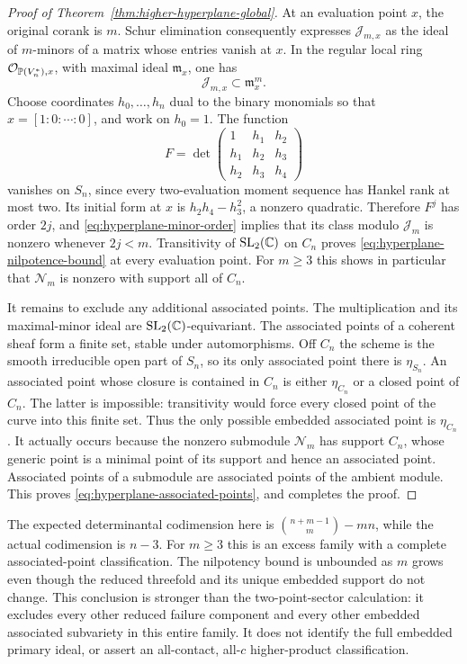 \begin{proof}[Proof of Theorem~\ref{thm:higher-hyperplane-global}]
At an evaluation point $x$, the original corank is $m$. Schur
elimination consequently expresses $\mathcal J_{m,x}$ as the ideal
of $m$-minors of a matrix whose entries vanish at $x$. In the regular
local ring $\mathcal O_{\mathbb P(V_n^*),x}$, with maximal ideal
$\mathfrak m_x$, one has
\begin{equation}\label{eq:hyperplane-minor-order}
 \mathcal J_{m,x}\subset\mathfrak m_x^m.
\end{equation}
Choose coordinates $h_0,\ldots,h_n$ dual to the binary monomials
so that $x=[1:0:\cdots:0]$, and work on $h_0=1$. The function
\[
 F=\det\begin{pmatrix}1&h_1&h_2\\h_1&h_2&h_3\\h_2&h_3&h_4\end{pmatrix}
\]
vanishes on $S_n$, since every two-evaluation moment sequence has
Hankel rank at most two. Its initial form at $x$ is
$h_2h_4-h_3^2$, a nonzero quadratic. Therefore $F^j$ has order
$2j$, and \eqref{eq:hyperplane-minor-order} implies that its class
modulo $\mathcal J_m$ is nonzero whenever $2j<m$.
Transitivity of $\operatorname{SL}_2(\mathbb C)$ on $C_n$ proves
\eqref{eq:hyperplane-nilpotence-bound} at every evaluation point.
For $m\ge3$ this shows in particular that $\mathcal N_m$ is nonzero
with support all of $C_n$.

It remains to exclude any additional associated points. The
multiplication and its maximal-minor ideal are
$\operatorname{SL}_2(\mathbb C)$-equivariant. The associated points of a
coherent sheaf form a finite set, stable under automorphisms.
Off $C_n$ the scheme is the smooth irreducible open part of $S_n$,
so its only associated point there is $\eta_{S_n}$. An associated
point whose closure is contained in $C_n$ is either $\eta_{C_n}$
or a closed point of $C_n$. The latter is impossible: transitivity
would force every closed point of the curve into this finite set.
Thus the only possible embedded associated point is $\eta_{C_n}$.
It actually occurs because the nonzero submodule $\mathcal N_m$
has support $C_n$, whose generic point is a minimal point of its
support and hence an associated point. Associated points of a
submodule are associated points of the ambient module. This proves
\eqref{eq:hyperplane-associated-points}, and completes the proof.
\end{proof}

The expected determinantal codimension here is
$\binom{n+m-1}{m}-mn$, while the actual codimension is $n-3$.
For $m\ge3$ this is an excess family with a complete associated-point
classification. The nilpotency bound is unbounded as $m$ grows even
though the reduced threefold and its unique embedded support do not
change. This conclusion is stronger than the two-point-sector
calculation: it excludes every other reduced failure component and
every other embedded associated subvariety in this entire family.
It does not identify the full embedded primary ideal, or assert an
all-contact, all-$c$ higher-product classification.
